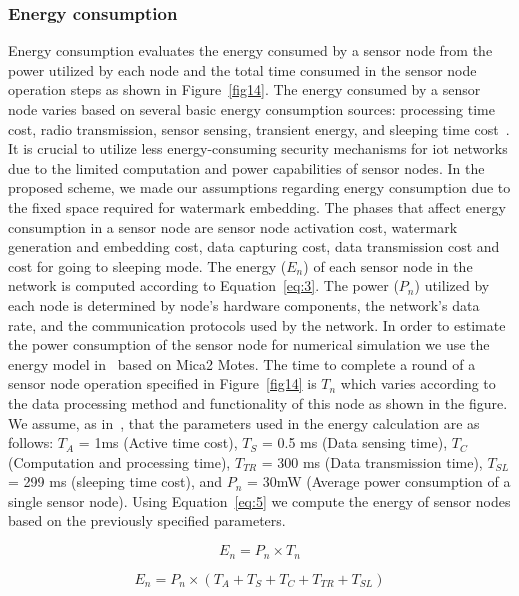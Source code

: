 \documentclass{llncs}
\begin{document}
\subsubsection{Energy consumption} Energy consumption evaluates the energy consumed by a sensor node from the power utilized by each node and the total time consumed in the sensor node operation steps as shown in Figure~\ref{fig14}. The energy consumed by a sensor node varies based on several basic energy consumption sources: processing time cost, radio transmission, sensor sensing, transient energy, and sleeping time cost~\cite{Halgamuge2009,Fu2013,Malka2009}. It is crucial to utilize less energy-consuming security mechanisms for \gls*{iot} networks due to the limited computation and power capabilities of sensor nodes. In the proposed scheme, we made our assumptions regarding energy consumption due to the fixed space required for watermark embedding. The phases that affect energy consumption in a sensor node are sensor node activation cost, watermark generation and embedding cost, data capturing cost, data transmission cost and cost for going to sleeping mode. The energy ($E_n$) of each sensor node in the network is computed according to Equation~\eqref{eq:3}. The power ($P_n$) utilized by each node is determined by node's hardware components, the network's data rate, and the communication protocols used by the network. In order to estimate the power consumption of the sensor node for numerical simulation we use the energy model in~\cite{Miller2005} based on Mica2 Motes. The time to complete a round of a sensor node operation specified in Figure~\ref{fig14} is $T_n$ which varies according to the data processing method and functionality of this node as shown in the figure. We assume, as in~\cite{Miller2005}, that the parameters used in the energy calculation are as follows: $T_{A}$ = 1ms (Active time cost), $T_{S}$ = 0.5 ms (Data sensing time), $T_{C}$ (Computation and processing time), $T_{TR}$ = 300 ms (Data transmission time), $T_{SL}$ = 299 ms (sleeping time cost), and $P_n$ = 30mW (Average power consumption of a single sensor node). Using Equation~\eqref{eq:5} we compute the energy of sensor nodes based on the previously specified parameters.

    \begin{equation} \label{eq:4}
    E_{n} = P_{n} \times T_{n}
    \end{equation}

    \begin{equation} \label{eq:5}
    E_{n} =  P_{n} \times (T_{A} + T_{S} + T_{C} + T_{TR} + T_{SL})
    \end{equation}
    
\end{document}
